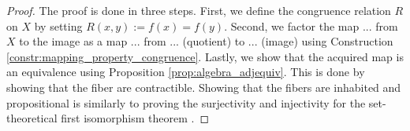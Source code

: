 \begin{proof}
The proof is done in three steps.
First, we define the congruence relation $R$ on $X$ by setting $R(x, y) := f(x) = f(y)$.
Second, we factor the map ... from $X$ to the image as a map ... from ... (quotient) to ... (image) using Construction \ref{constr:mapping_property_congruence}.
Lastly, we show that the acquired map is an equivalence using Proposition \ref{prop:algebra_adjequiv}.
This is done by showing that the fiber are contractible.
Showing that the fibers are inhabited and propositional is similarly to proving the surjectivity and injectivity for the set-theoretical first isomorphism theorem \cite{lynge2019}.
\end{proof}
